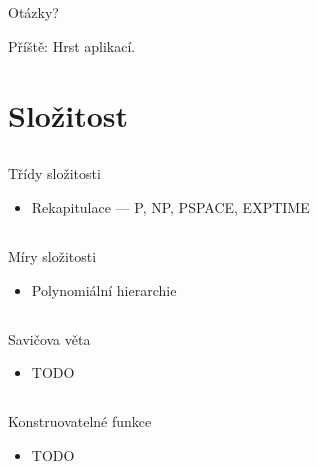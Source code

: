 \documentclass{beamer}
\begin{document}
\subsection{}
\begin{frame}{Otázky?}
\begin{center}
Příště: Hrst aplikací.
\end{center}
\end{frame}

\section{Složitost}

\subsection{}
\begin{frame}{Třídy složitosti}
\begin{itemize}
\item Rekapitulace --- P, NP, PSPACE, EXPTIME
\end{itemize}
\end{frame}

\subsection{}
\begin{frame}{Míry složitosti}
\begin{itemize}
\item Polynomiální hierarchie
\end{itemize}
\end{frame}

\subsection{}
\begin{frame}{Savičova věta}
\begin{itemize}
\item TODO
\end{itemize}
\end{frame}

\subsection{}
\begin{frame}{Konstruovatelné funkce}
\begin{itemize}
\item TODO
\end{itemize}
\end{frame}
\end{document}

